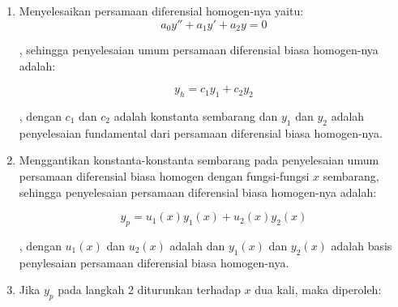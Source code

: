 \begin{enumerate}[1.]

	\item Menyelesaikan persamaan diferensial homogen-nya yaitu:
	\begin{displaymath} a_0 y'' + a_1 y' + a_2 y = 0 \end{displaymath}

	, sehingga penyelesaian umum persamaan diferensial biasa homogen-nya adalah:

	\begin{equation} y_h = c_1 y_1 + c_2 y_2 \end{equation}
	
	, dengan \begin{math} c_1 \end{math} dan \begin{math} c_2 \end{math} adalah konstanta sembarang dan \begin{math} y_1 \end{math} dan \begin{math} y_2 \end{math} adalah penyelesaian fundamental dari persamaan diferensial biasa homogen-nya.

	\item Menggantikan konstanta-konstanta sembarang pada penyelesaian umum persamaan diferensial biasa homogen dengan fungsi-fungsi \begin{math} x \end{math} sembarang, sehingga penyelesaian persamaan diferensial biasa homogen-nya adalah:

	\begin{equation} y_p = u_1 (x) y_1 (x) + u_2 (x) y_2 (x) \end{equation}

	, dengan \begin{math} u_1 (x) \end{math} dan \begin{math} u_2 (x) \end{math} adalah dan \begin{math} y_1 (x) \end{math} dan \begin{math} y_2 (x) \end{math} adalah basis penylesaian persamaan diferensial biasa homogen-nya.

	\item Jika \begin{math} y_p \end{math} pada langkah 2 diturunkan terhadap \begin{math} x \end{math} dua kali, maka diperoleh:


\end{enumerate}

